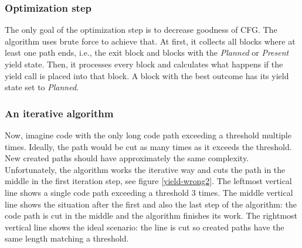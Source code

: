 \subsubsection{Optimization step}
The only goal of the optimization step is to decrease goodness of CFG. The algorithm uses brute force to achieve that. At first, it collects all blocks where at least one path ends, i.e., the exit block and blocks with the \emph{Planned} or \emph{Present} yield state. Then,  it processes every block and calculates what happens if the yield call is placed into that block. A block with the best outcome has its yield state set to \emph{Planned}.

\subsubsection{An iterative algorithm}
Now, imagine code with the only long code path exceeding a threshold multiple times. Ideally, the path would be cut as many times as it exceeds the threshold. New created paths should have approximately the same complexity. Unfortunately, the algorithm works the iterative way and cuts the path in the middle in the first iteration step, see figure \ref{yield-wrong2}. The leftmost vertical line shows a single code path exceeding a threshold 3 times. The middle vertical line shows the situation after the first and also the last step of the algorithm: the code path is cut in the middle and the algorithm finishes its work. The rightmost vertical line shows the ideal scenario: the line is cut so created paths have the same length matching a threshold.

